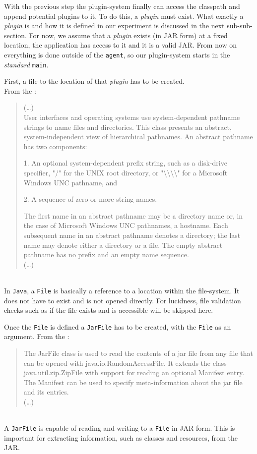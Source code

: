 With the previous step the plugin-system finally can access the classpath and append potential plugins to it.
To do this, a \textit{plugin} must exist.
What exactly a \textit{plugin} is and how it is defined in our experiment is discussed in the next sub-sub-section.
For now, we assume that a \textit{plugin} exists (in JAR form) at a fixed location, the application has access to it and it is a valid JAR.
From now on everything is done outside of the \texttt{agent}, so our plugin-system starts in the \textit{standard} \lstinline{main}.

First, a file to the location of that \textit{plugin} has to be created.\\
From the \textcite{javadoc:file}:
\begin{quote}
    (\dots)
    \\
    User interfaces and operating systems use system-dependent pathname strings to name files and directories. This class presents an abstract, system-independent view of hierarchical pathnames. An abstract pathname has two components:

        1. An optional system-dependent prefix string, such as a disk-drive specifier, "/" for the UNIX root directory, or "\textbackslash\textbackslash\textbackslash\textbackslash" for a Microsoft Windows UNC pathname, and

        2. A sequence of zero or more string names.

    The first name in an abstract pathname may be a directory name or, in the case of Microsoft Windows UNC pathnames, a hostname. Each subsequent name in an abstract pathname denotes a directory; the last name may denote either a directory or a file. The empty abstract pathname has no prefix and an empty name sequence.
    \\
    (\dots)
\end{quote}~\parencite{javadoc:file}\\
In \texttt{Java}, a \lstinline{File} is basically a reference to a location within the file-system.
It does not have to exist and is not opened directly.
For lucidness, file validation checks such as if the file exists and is accessible will be skipped here.

Once the \lstinline{File} is defined a \lstinline{JarFile} has to be created, with the \lstinline{File} as an argument.
From the \textcite{javadoc:jar_file}:
\begin{quote}
    The JarFile class is used to read the contents of a jar file from any file that can be opened with java.io.RandomAccessFile. It extends the class java.util.zip.ZipFile with support for reading an optional Manifest entry. The Manifest can be used to specify meta-information about the jar file and its entries.
    \\
    (\dots)
\end{quote}~\parencite{javadoc:jar_file}\\
A \lstinline{JarFile} is capable of reading and writing to a \lstinline{File} in JAR form.
This is important for extracting information, such as classes and resources, from the JAR.

